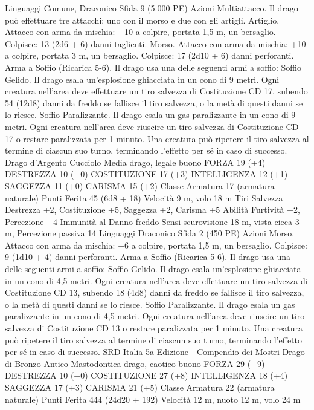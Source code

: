 \begin{multicols}{2}
Linguaggi Comune, Draconico
Sfida 9 (5.000 PE)
Azioni
Multiattacco. Il drago può effettuare tre attacchi: uno con il
morso e due con gli artigli.
Artiglio. Attacco con arma da mischia: +10 a colpire, portata 1,5
m, un bersaglio.
Colpisce: 13 (2d6 + 6) danni taglienti.
Morso. Attacco con arma da mischia: +10 a colpire, portata 3 m,
un bersaglio.
Colpisce: 17 (2d10 + 6) danni perforanti.
Arma a Soffio (Ricarica 5-6). Il drago usa una delle seguenti armi
a soffio:
Soffio Gelido. Il drago esala un’esplosione ghiacciata in un cono di 9
metri. Ogni creatura nell’area deve effettuare un tiro salvezza di
Costituzione CD 17, subendo 54 (12d8) danni da freddo se fallisce il
tiro salvezza, o la metà di questi danni se lo riesce.
Soffio Paralizzante. Il drago esala un gas paralizzante in un cono di 9
metri. Ogni creatura nell’area deve riuscire un tiro salvezza di
Costituzione CD 17 o restare paralizzata per 1 minuto. Una creatura
può ripetere il tiro salvezza al termine di ciascun suo turno,
terminando l’effetto per sé in caso di successo.
Drago d’Argento Cucciolo
Media drago, legale buono
FORZA 19 (+4)
DESTREZZA 10 (+0)
COSTITUZIONE 17 (+3)
INTELLIGENZA 12 (+1)
SAGGEZZA 11 (+0)
CARISMA 15 (+2)
Classe Armatura 17 (armatura naturale)
Punti Ferita 45 (6d8 + 18)
Velocità 9 m, volo 18 m
Tiri Salvezza Destrezza +2, Costituzione +5, Saggezza +2,
Carisma +5
Abilità Furtività +2, Percezione +4
Immunità al Danno freddo
Sensi scurovisione 18 m, vista cieca 3 m, Percezione passiva 14
Linguaggi Draconico
Sfida 2 (450 PE)
Azioni
Morso. Attacco con arma da mischia: +6 a colpire, portata 1,5
m, un bersaglio.
Colpisce: 9 (1d10 + 4) danni perforanti.
Arma a Soffio (Ricarica 5-6). Il drago usa una delle seguenti armi
a soffio:
Soffio Gelido. Il drago esala un’esplosione ghiacciata in un cono di
4,5 metri. Ogni creatura nell’area deve effettuare un tiro salvezza di
Costituzione CD 13, subendo 18 (4d8) danni da freddo se fallisce il
tiro salvezza, o la metà di questi danni se lo riesce.
Soffio Paralizzante. Il drago esala un gas paralizzante in un cono di
4,5 metri. Ogni creatura nell’area deve riuscire un tiro salvezza di
Costituzione CD 13 o restare paralizzata per 1 minuto. Una creatura
può ripetere il tiro salvezza al termine di ciascun suo turno,
terminando l’effetto per sé in caso di successo.
SRD Italia 5a Edizione - Compendio dei Mostri
Drago di Bronzo Antico
Mastodontica drago, caotico buono
FORZA 29 (+9)
DESTREZZA 10 (+0)
COSTITUZIONE 27 (+8)
INTELLIGENZA 18 (+4)
SAGGEZZA 17 (+3)
CARISMA 21 (+5)
Classe Armatura 22 (armatura naturale)
Punti Ferita 444 (24d20 + 192)
Velocità 12 m, nuoto 12 m, volo 24 m

\end{multicols}
